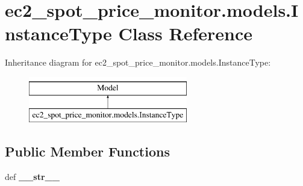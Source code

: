 \hypertarget{classec2__spot__price__monitor_1_1models_1_1InstanceType}{\section{ec2\-\_\-spot\-\_\-price\-\_\-monitor.\-models.\-Instance\-Type Class Reference}
\label{classec2__spot__price__monitor_1_1models_1_1InstanceType}
}
Inheritance diagram for ec2\-\_\-spot\-\_\-price\-\_\-monitor.\-models.\-Instance\-Type\-:\begin{figure}[H]
\begin{center}
\leavevmode
\includegraphics[height=2.000000cm]{classec2__spot__price__monitor_1_1models_1_1InstanceType}
\end{center}
\end{figure}
\subsection*{Public Member Functions}
\begin{DoxyCompactItemize}
\item 
\hypertarget{classec2__spot__price__monitor_1_1models_1_1InstanceType_a930b3ccbc93e4fe84758821f3573524c}{def {\bfseries \-\_\-\-\_\-str\-\_\-\-\_\-}}\label{classec2__spot__price__monitor_1_1models_1_1InstanceType_a930b3ccbc93e4fe84758821f3573524c}

\end{DoxyCompactItemize}

